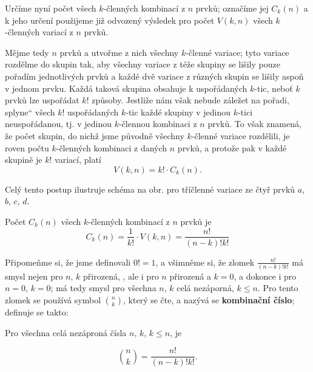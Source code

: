     Určíme nyní počet všech \(k\)-členných kombinací z \(n\) prvků; označíme jej \(C_k(n)\) a k jeho
    určení použijeme již odvozený výsledek pro počet \(V(k,n)\) všech \(k\)-členných variací z \(n\)
    prvků.

    Mějme tedy \(n\) prvků a utvořme z nich všechny \(k\)-členné variace; tyto variace rozdělme do
    skupin tak, aby všechny variace z téže skupiny se lišily pouze pořadím jednotlivých prvků a
    každé dvě variace z různých skupin se lišily aspoň v jednom prvku. Každá taková skupina obsahuje
    k uspořádaných \(k\)-tic, neboť \(k\) prvků lze uspořádat \(k!\) způsoby. Jestliže nám však
    nebude záležet na pořadi, splyne“ všech \(k!\) uspořádaných \(k\)-tic každé skupiny v jedinou
    \(k\)-tici neuspořádanou, tj. v jedinou \(k\)-člennou kombinaci z \(n\) prvků. To však znamená,
    že počet skupin, do nichž jsme původně všechny \(k\)-členné variace rozdělili, je roven počtu
    \(k\)-členných kombinaci z daných \(n\) prvků, a protože pak v každé skupině je \(k!\) variací,
    platí
    \begin{equation*}
      V(k,n) = k!\cdot C_k(n).
    \end{equation*}

    Celý tento postup ilustruje schéma na obr.  pro tříčlenné variace ze čtyř prvků \(a\), \(b\),
    \(c\), \(d\).

    
    Počet \(C_k(n)\) všech \(k\)-členných kombinací z \(n\) prvků je
    \begin{equation*}
      C_k(n) = \dfrac{1}{k!}\cdot V(k,n) = \dfrac{n!}{(n-k)!k!}
    \end{equation*}

    Připomeňme si, že jsme definovali \(0! = 1\), a všimněme si, že zlomek \(\frac{n!}{(n-k)!k!}\)
    má smysl nejen pro \(n\), \(k\) přirozená, , ale i pro \(n\) přirozená a \(k=0\), a dokonce i
    pro \(n = 0\), \(k = 0\); má tedy smysl pro všechna \(n\), \(k\) celá nezáporná, \(k\leq n\).
    Pro tento zlomek se používá symbol \(\binom{n}{k}\), který se čte,  a nazývá se
    \textbf{kombinační číslo}; definuje se takto:

    \begin{mdframed}[style=highlight] Pro všechna celá nezáproná čísla \(n\), \(k\), \(k\leq n\), je
      
      \begin{equation*}
        \binom{n}{k} = \dfrac{n!}{(n-k)!k!}.
      \end{equation*}  
    \end{mdframed}

